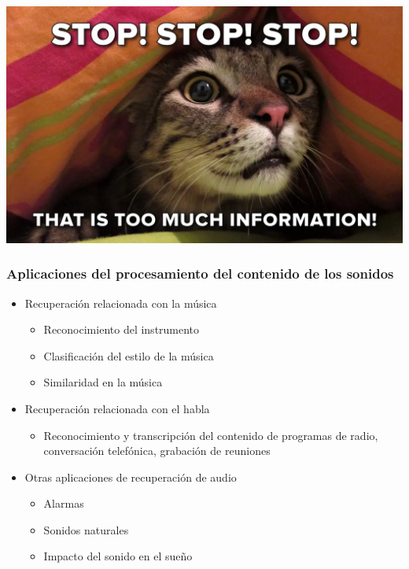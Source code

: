 \documentclass[
10pt, %
aspectratio=169, %
]{beamer}
\begin{document}
	{
		{%
			\includegraphics[width=\paperwidth,height=\paperheight]{mucho.png}
		}
		
		\begin{frame}
		\end{frame}
	}
	
	\begin{frame}
		
		\frametitle{Aplicaciones del procesamiento del contenido de los  sonidos}
		
		\begin{itemize}
			\item Recuperación relacionada con la música
			\begin{itemize}
				\item Reconocimiento del instrumento
				\item Clasificación del estilo de la música
				\item Similaridad en la música				
			\end{itemize}
			
			
			\item Recuperación relacionada con el habla
			\begin{itemize}
				\item Reconocimiento y transcripción del contenido de programas de radio, conversación telefónica, grabación de reuniones
			\end{itemize}
			
			\item Otras aplicaciones de recuperación de audio
			\begin{itemize}
				\item Alarmas
				\item Sonidos naturales
				\item Impacto del sonido en el sueño
			\end{itemize}
			
		\end{itemize}
		
	\end{frame}
		
\end{document}
